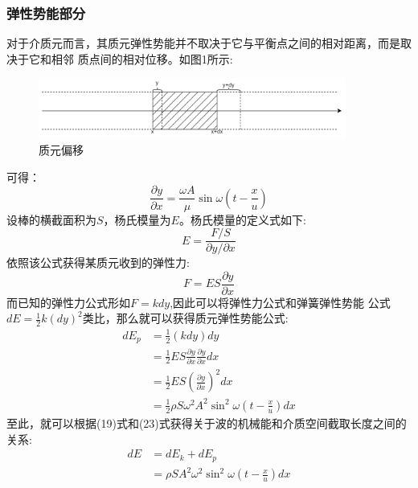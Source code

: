 \documentclass[lang=cn,a4paper,newtx]{elegantpaper}
\begin{document}
    \subsubsection{弹性势能部分}
    对于介质元而言，其质元弹性势能并不取决于它与平衡点之间的相对距离，而是取决于它和相邻
    质点间的相对位移。如图1所示:
    \begin{figure}[htbp]
      \centering
      \includegraphics[width=0.9\textwidth]{./image/particleOffset}
      \caption{质元偏移}
    \end{figure}
    可得：
    \begin{equation}
      \frac{\partial y}{\partial x}=\frac{\omega A}{\mu} \sin \omega(t-\frac{x}{u})
    \end{equation}
    设棒的横截面积为$S$，杨氏模量为$E$。杨氏模量的定义式如下:
    \begin{equation}
      E=\frac{F/S}{\partial y/\partial x}
    \end{equation}
    依照该公式获得某质元收到的弹性力:
    \begin{equation}
      F=ES\frac{\partial y}{\partial x}
    \end{equation}
    而已知的弹性力公式形如$F=kdy$,因此可以将弹性力公式和弹簧弹性势能
    公式$dE=\frac{1}{2}k(dy)^2$类比，那么就可以获得质元弹性势能公式:
    \begin{equation}
      \begin{aligned}
      dE_p&=\frac{1}{2}(kdy)dy\\
      &=\frac{1}{2}ES\frac{\partial y}{\partial x}\frac{\partial y}{\partial x}dx\\
      &=\frac{1}{2}ES(\frac{\partial y}{\partial x})^2dx\\
      &=\frac{1}{2}\rho S\omega^2A^2\sin^2\omega(t-\frac{x}{u})dx
      \end{aligned}
    \end{equation}
    至此，就可以根据(19)式和(23)式获得关于波的机械能和介质空间截取长度之间的关系:
    \begin{equation}
      \begin{aligned}
        dE&=dE_k+dE_p\\
        &=\rho SA^2 \omega^2 \sin^2 \omega(t-\frac{x}{u})dx
      \end{aligned}
    \end{equation}
\end{document}
